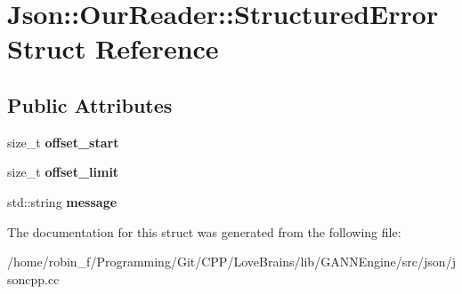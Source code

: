 \section{Json\+:\+:Our\+Reader\+:\+:Structured\+Error Struct Reference}
\label{struct_json_1_1_our_reader_1_1_structured_error}
\subsection*{Public Attributes}
\begin{DoxyCompactItemize}
\item 
size\+\_\+t {\bfseries offset\+\_\+start}\label{struct_json_1_1_our_reader_1_1_structured_error_a4eec161c2a6b4c89b6eb3d8d83834443}

\item 
size\+\_\+t {\bfseries offset\+\_\+limit}\label{struct_json_1_1_our_reader_1_1_structured_error_a6bab2650e5230fc15427b309de79fdbe}

\item 
std\+::string {\bfseries message}\label{struct_json_1_1_our_reader_1_1_structured_error_adc8a757b6452cc6ab14fb90b933b3414}

\end{DoxyCompactItemize}


The documentation for this struct was generated from the following file\+:\begin{DoxyCompactItemize}
\item 
/home/robin\+\_\+f/\+Programming/\+Git/\+C\+P\+P/\+Love\+Brains/lib/\+G\+A\+N\+N\+Engine/src/json/jsoncpp.\+cc\end{DoxyCompactItemize}
